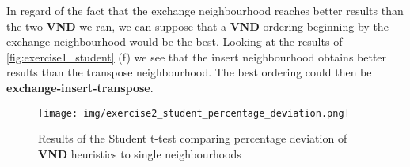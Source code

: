 \documentclass[a4paper,10pt]{article}
\begin{document}
In regard of the fact that the exchange neighbourhood reaches better results than the two \textbf{VND} we ran, we can suppose that a \textbf{VND} ordering beginning by the exchange neighbourhood would be the best. Looking at the results of \ref{fig:exercise1_student} (f) we see that the insert neighbourhood obtains better results than the transpose neighbourhood. The best ordering could then be \textbf{exchange-insert-transpose}.

\begin{figure}[H]
	\centering
	\caption{Results of the Student t-test comparing percentage deviation of \textbf{VND} heuristics to single neighbourhoods}
	\texttt{[image: img/exercise2\_student\_percentage\_deviation.png]}
\end{figure}
\end{document}
